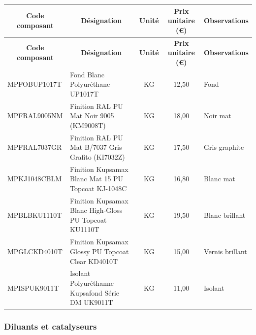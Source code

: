 \documentclass[12pt,a4paper]{article}
\begin{document}
\begin{longtable}{|p{4cm}|p{7cm}|c|c|p{2cm}|}
\hline
\multicolumn{1}{|c|}{\textbf{Code composant}} & \multicolumn{1}{c|}{\textbf{Désignation}} & \multicolumn{1}{c|}{\textbf{Unité}} & \multicolumn{1}{c|}{\textbf{Prix unitaire (€)}} & \multicolumn{1}{c|}{\textbf{Observations}} \\
\hline
\endfirsthead
\hline
\multicolumn{1}{|c|}{\textbf{Code composant}} & \multicolumn{1}{c|}{\textbf{Désignation}} & \multicolumn{1}{c|}{\textbf{Unité}} & \multicolumn{1}{c|}{\textbf{Prix unitaire (€)}} & \multicolumn{1}{c|}{\textbf{Observations}} \\
\hline
\endhead
\hline
\endfoot
MPFOBUP1017T & Fond Blanc Polyuréthane UP1017T & KG & 12,50 & Fond \\
MPFRAL9005NM & Finition RAL PU Mat Noir 9005 (KM9008T) & KG & 18,00 & Noir mat \\
MPFRAL7037GR & Finition RAL PU Mat B/7037 Gris Grafito (KI7032Z) & KG & 17,50 & Gris graphite \\
MPKJ1048CBLM & Finition Kupsamax Blanc Mat 15 PU Topcoat KJ-1048C & KG & 16,80 & Blanc mat \\
MPBLBKU1110T & Finition Kupsamax Blanc High-Gloss PU Topcoat KU1110T & KG & 19,50 & Blanc brillant \\
MPGLCKD4010T & Finition Kupsamax Glossy PU Topcoat Clear KD4010T & KG & 15,00 & Vernis brillant \\
MPISPUK9011T & Isolant Polyuréthanne Kupsafond Série DM UK9011T & KG & 11,00 & Isolant \\
\hline
\end{longtable}

\subsubsection{Diluants et catalyseurs}
\end{document}
